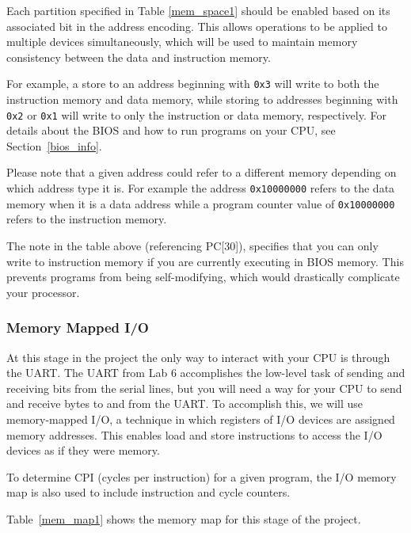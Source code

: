 \documentclass[11pt]{article}
\begin{document}
Each partition specified in Table \ref{mem_space1} should be enabled based on its associated bit in the address encoding.
This allows operations to be applied to multiple devices simultaneously, which will be used to maintain memory consistency between the data and instruction memory.

For example, a store to an address beginning with \verb|0x3| will write to both the instruction memory and data memory, while storing to addresses beginning with \verb|0x2| or \verb|0x1| will write to only the instruction or data memory, respectively.
For details about the BIOS and how to run programs on your CPU, see Section~\ref{bios_info}.

Please note that a given address could refer to a different memory depending on which address type it is.
For example the address \verb|0x10000000| refers to the data memory when it is a data address while a program counter value of \verb|0x10000000| refers to the instruction memory.

The note in the table above (referencing PC[30]), specifies that you can only write to instruction memory if you are currently executing in BIOS memory.
This prevents programs from being self-modifying, which would drastically complicate your processor.

\subsubsection{Memory Mapped I/O}
\label{mmio}
At this stage in the project the only way to interact with your CPU is through the UART.
The UART from Lab 6 accomplishes the low-level task of sending and receiving bits from the serial lines, but you will need a way for your CPU to send and receive bytes to and from the UART.
To accomplish this, we will use memory-mapped I/O, a technique in which registers of I/O devices are assigned memory addresses.
This enables load and store instructions to access the I/O devices as if they were memory.

To determine CPI (cycles per instruction) for a given program, the I/O memory map is also used to include instruction and cycle counters.

Table~\ref{mem_map1} shows the memory map for this stage of the project.
\end{document}
